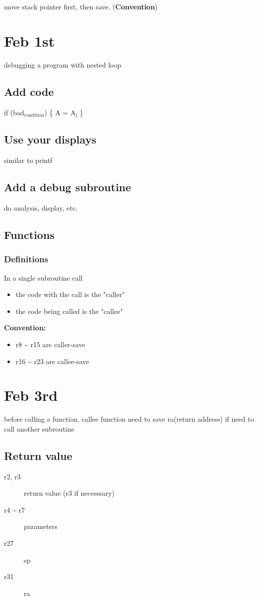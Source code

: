 \documentclass[11pt]{article}
\begin{document}
move stack pointer first, then save. (\textbf{Convention})

\section{Feb 1st}
\label{sec:orgheadline46}
debugging a program with nested loop
\subsection{Add code}
\label{sec:orgheadline41}
if (bad\(_{\text{condition}}\)) \{ A = A\(_{\text{j}}\) \}
\subsection{Use your displays}
\label{sec:orgheadline42}
similar to printf
\subsection{Add a debug subroutine}
\label{sec:orgheadline43}
do analysis, display, etc.
\subsection{Functions}
\label{sec:orgheadline45}
\subsubsection{Definitions}
\label{sec:orgheadline44}
In a single subroutine call
\begin{itemize}
\item the code with the call is the "caller"
\item the code being called is the "callee"
\end{itemize}
\textbf{Convention:}
\begin{itemize}
\item r8 \textasciitilde{} r15 are caller-save
\item r16 \textasciitilde{} r23 are callee-save
\end{itemize}

\section{Feb 3rd}
\label{sec:orgheadline54}
before calling a function, callee function need to save ra(return address) if need to call another subroutine
\subsection{Return value}
\label{sec:orgheadline48}
\begin{description}
\item[{r2, r3}] return value (r3 if necesssary)
\item[{r4 \textasciitilde{} r7}] parameters
\item[{r27}] sp
\item[{r31}] ra
\end{description}
\end{document}
